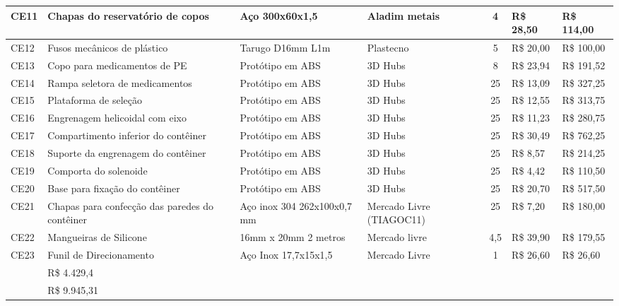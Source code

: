 \begin{table}[H]
\begin{adjustbox}{max width = 0.9\textwidth}
\begin{tabular}{|l|G{4cm}|C{2.4cm}|L{3.2cm}|c|l|l|}
        CE11 & Chapas do reservatório de copos & Aço 300x60x1,5 & Aladim metais & 4 & R\$ 28,50 & R\$ 114,00  \\ \hline
        CE12 & Fusos mecânicos de plástico & Tarugo D16mm L1m  & Plastecno & 5 & R\$ 20,00 & R\$ 100,00  \\ \hline
        CE13 & Copo para medicamentos de PE & Protótipo em ABS & 3D Hubs & 8 & R\$ 23,94 & R\$ 191,52  \\ \hline
        CE14 & Rampa seletora de medicamentos & Protótipo em ABS & 3D Hubs  & 25 & R\$ 13,09 & R\$ 327,25  \\ \hline
        CE15 & Plataforma de seleção & Protótipo em ABS & 3D Hubs & 25  & R\$ 12,55 & R\$ 313,75  \\ \hline
        CE16 & Engrenagem helicoidal com eixo & Protótipo em ABS & 3D Hubs & 25  & R\$ 11,23 & R\$ 280,75  \\ \hline
        CE17 & Compartimento inferior do contêiner & Protótipo em ABS & 3D Hubs & 25  & R\$ 30,49 & R\$ 762,25  \\ \hline
        CE18 & Suporte da engrenagem do contêiner & Protótipo em ABS & 3D Hubs & 25  & R\$ 8,57 & R\$ 214,25  \\ \hline
        CE19 & Comporta do solenoide & Protótipo em ABS & 3D Hubs & 25  & R\$ 4,42 & R\$ 110,50  \\ \hline
        CE20 & Base para fixação do contêiner & Protótipo em ABS & 3D Hubs & 25  & R\$ 20,70 & R\$ 517,50  \\ \hline
        CE21 & Chapas para confecção das paredes do contêiner & Aço inox 304 262x100x0,7 mm & Mercado Livre (TIAGOC11) & 25  & R\$ 7,20 & R\$ 180,00  \\ \hline
        CE22 & Mangueiras de Silicone & 16mm x 20mm 2 metros & Mercado livre & 4,5 & R\$ 39,90 & R\$ 179,55 \\ \hline
        CE23 & Funil de Direcionamento & Aço Inox 17,7x15x1,5 & Mercado Livre & 1 & R\$ 26,60 & R\$ 26,60 \\ \hline
        
         & R\$ 4.429,4\\ \hline
        
         & \color{white}R\$ 9.945,31\\ \hline
        \end{tabular}
	\end{adjustbox}
\end{table}


